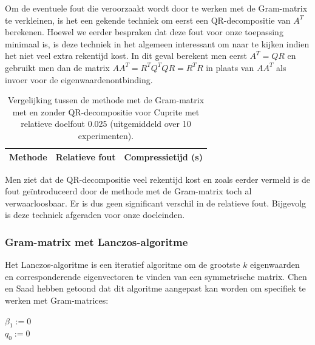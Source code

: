 Om de eventuele fout die veroorzaakt wordt door te werken met de Gram-matrix te verkleinen, is het een gekende techniek om eerst een QR-decompositie van $A^T$ berekenen. Hoewel we eerder bespraken dat deze fout voor onze toepassing minimaal is, is deze techniek in het algemeen interessant om naar te kijken indien het niet veel extra rekentijd kost. In dit geval berekent men eerst $A^T = QR$ en gebruikt men dan de matrix $A A^T = R^T Q^T Q R = R^T R$ in plaats van $A A^T$ als invoer voor de eigenwaardenontbinding.\\

\begin{table}[H]
\centering
\begin{tabular}{|l|l|l|}
\hline
Methode & Relatieve fout & Compressietijd (s)\\ \hline

\end{tabular}
\caption{Vergelijking tussen de methode met de Gram-matrix met en zonder QR-decompositie voor Cuprite met relatieve doelfout 0.025 (uitgemiddeld over 10 experimenten).}
\end{table}

Men ziet dat de QR-decompositie veel rekentijd kost en zoals eerder vermeld is de fout ge\"introduceerd door de methode met de Gram-matrix toch al verwaarloosbaar. Er is dus geen significant verschil in de relatieve fout. Bijgevolg is deze techniek afgeraden voor onze doeleinden.

\subsubsection{Gram-matrix met Lanczos-algoritme}

Het Lanczos-algoritme \cite{ref:lanczos} is een iteratief algoritme om de grootste $k$ eigenwaarden en corresponderende eigenvectoren te vinden van een symmetrische matrix. Chen en Saad \cite{ref:saad} hebben getoond dat dit algoritme aangepast kan worden om specifiek te werken met Gram-matrices:\\

\begin{algorithm}[H]
$\beta_1 := 0$\\
$q_0 := 0$\\
\end{algorithm}

